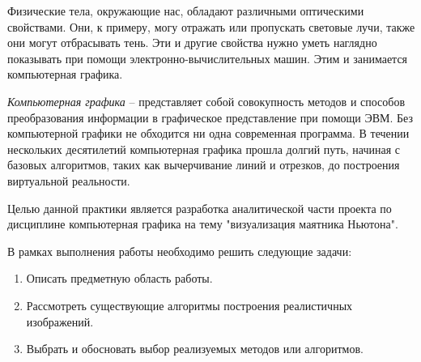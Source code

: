 \Introduction

Физические тела, окружающие нас, обладают различными оптическими свойствами. Они, к примеру, могу отражать или пропускать световые лучи, также они могут отбрасывать тень. Эти и другие свойства нужно уметь наглядно показывать при помощи электронно-вычислительных машин. Этим и занимается компьютерная графика.

\textit{Компьютерная графика} -- представляет собой совокупность методов и способов преобразования информации в графическое представление при помощи ЭВМ. Без компьютерной графики не обходится ни одна современная программа. В течении нескольких десятилетий компьютерная графика прошла долгий путь, начиная с базовых алгоритмов, таких как вычерчивание линий и отрезков, до построения виртуальной реальности. 

Целью данной практики является разработка аналитической части проекта по дисциплине компьютерная графика на тему "визуализация маятника Ньютона".

В рамках выполнения работы необходимо решить следующие задачи:
\begin{enumerate}
	\item Описать предметную область работы.
	\item Рассмотреть существующие алгоритмы построения реалистичных изображений.
	\item Выбрать и обосновать выбор реализуемых методов или алгоритмов.
\end{enumerate}
